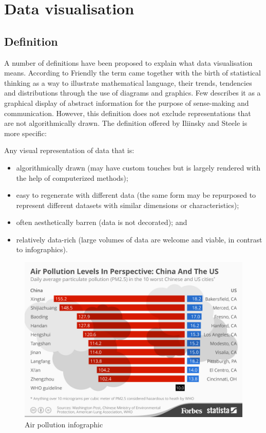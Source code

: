 \section{Data visualisation}

\subsection{Definition}
A number of definitions have been proposed to explain what data visualisation means. According to Friendly \cite{Friendly2009} the term came together with the birth of statistical thinking as a way to illustrate mathematical language, their trends, tendencies and distributions through the use of diagrams and graphics. Few \cite{StephenFew2013} describes it as a graphical display of abstract information for the purpose of sense-making and communication. 
However, this definition does not exclude representations that are not algorithmically drawn. The definition offered by Iliinsky and Steele \cite{Iliinsky2011} is more specific: 
\begin{displayquote}
Any visual representation of data that is:
	\begin{itemize}
	\item algorithmically drawn (may have custom touches but is largely rendered with the help of computerized methods);
	\item easy to regenerate with different data (the same form may be repurposed to represent different datasets with similar dimensions or characteristics);
	\item often aesthetically barren (data is not decorated); and
	\item relatively data-rich (large volumes of data are welcome and viable, in contrast to infographics).
    \end{itemize}
\end{displayquote}
\iffalse
\begin{figure}[h]
  \centering
  \begin{adjustbox}{width=.8\textwidth,center=\textwidth}
  \includegraphics[scale=1]{images/air_pollution_infographic.jpg}
  \end{adjustbox}
  \caption[Air pollution infographic]{Air pollution infographic \cite{NiallMcCarthy}}
  \label{fig:air_pollution_infographic}
\end{figure}
